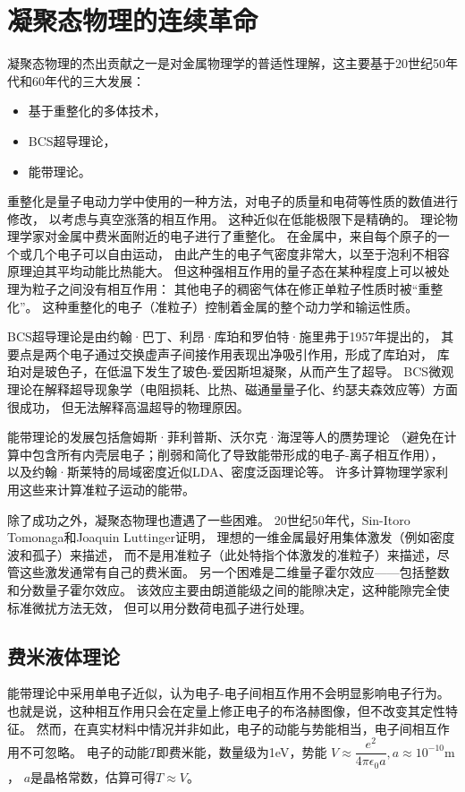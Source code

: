 \documentclass{article}
\begin{document}
\pagestyle{fancy}
\lhead{}
\rhead{}
\section{凝聚态物理的连续革命}

凝聚态物理的杰出贡献之一是对金属物理学的普适性理解，这主要基于20世纪50年代和60年代的三大发展：
\begin{itemize}
    \item 基于重整化的多体技术，
    \item BCS超导理论，
    \item 能带理论。
\end{itemize}

重整化是量子电动力学中使用的一种方法，对电子的质量和电荷等性质的数值进行修改，
以考虑与真空涨落的相互作用。
这种近似在低能极限下是精确的。
理论物理学家对金属中费米面附近的电子进行了重整化。
在金属中，来自每个原子的一个或几个电子可以自由运动，
由此产生的电子气密度非常大，以至于泡利不相容原理迫其平均动能比热能大。
但这种强相互作用的量子态在某种程度上可以被处理为粒子之间没有相互作用：
其他电子的稠密气体在修正单粒子性质时被“重整化”。
这种重整化的电子（准粒子）控制着金属的整个动力学和输运性质。


BCS超导理论是由约翰·巴丁、利昂·库珀和罗伯特·施里弗于1957年提出的，
其要点是两个电子通过交换虚声子间接作用表现出净吸引作用，形成了库珀对，
库珀对是玻色子，在低温下发生了玻色-爱因斯坦凝聚，从而产生了超导。
BCS微观理论在解释超导现象学（电阻损耗、比热、磁通量量子化、约瑟夫森效应等）方面很成功，
但无法解释高温超导的物理原因。

能带理论的发展包括詹姆斯·菲利普斯、沃尔克·海涅等人的赝势理论
（避免在计算中包含所有内壳层电子；削弱和简化了导致能带形成的电子-离子相互作用），
以及约翰·斯莱特的局域密度近似LDA、密度泛函理论等。
许多计算物理学家利用这些来计算准粒子运动的能带。


除了成功之外，凝聚态物理也遭遇了一些困难。
20世纪50年代，Sin-Itoro Tomonaga和Joaquin Luttinger证明，
理想的一维金属最好用集体激发（例如密度波和孤子）来描述，
而不是用准粒子（此处特指个体激发的准粒子）来描述，尽管这些激发通常有自己的费米面。
另一个困难是二维量子霍尔效应——包括整数和分数量子霍尔效应。
该效应主要由朗道能级之间的能隙决定，这种能隙完全使标准微扰方法无效，
但可以用分数荷电孤子进行处理。

\subsection{费米液体理论}
能带理论中采用单电子近似，认为电子-电子间相互作用不会明显影响电子行为。
也就是说，这种相互作用只会在定量上修正电子的布洛赫图像，但不改变其定性特征。
然而，在真实材料中情况并非如此，电子的动能与势能相当，电子间相互作用不可忽略。
电子的动能$T$即费米能，数量级为1eV，势能
$V\approx\dfrac{e^2}{4\pi\epsilon_0a}, a\approx 10^{-10}\mathrm{m}$，
$a$是晶格常数，估算可得$T\approx V$。
\end{document}
